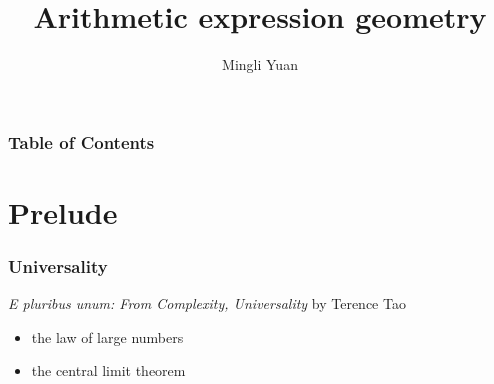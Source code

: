 \documentclass[aspectratio=169]{beamer}
\title{Arithmetic expression geometry}
\author[Author] {Mingli Yuan}
\begin{document}
\pgfplotsset{compat=1.18}

\begin{frame}
\maketitle
\end{frame}

\begin{frame}
\frametitle{Table of Contents}
\tableofcontents
\end{frame}

\section{Prelude}

\begin{frame}
\frametitle{Universality}
\emph{E pluribus unum: From Complexity, Universality} by Terence Tao
\begin{itemize}
    \item the law of large numbers
    \item the central limit theorem
\end{itemize}
\begin{figure}[ht]\centering
{}

\end{figure}
\end{frame}
\end{document}
